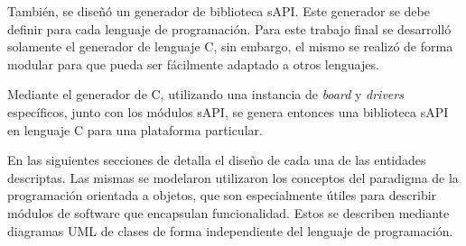 También, se diseñó un generador de biblioteca sAPI. Este generador se debe definir para cada lenguaje de programación. Para este trabajo final se desarrolló solamente el generador de lenguaje C, sin embargo, el mismo se realizó de forma modular para que pueda ser fácilmente adaptado a otros lenguajes. 

Mediante el generador de C, utilizando una instancia de \emph{board} y \emph{drivers} específicos, junto con los módulos sAPI, se genera entonces una biblioteca sAPI en lenguaje C para una plataforma particular.

En las siguientes secciones de detalla el diseño de cada una de las entidades descriptas. Las mismas se modelaron utilizaron los conceptos del paradigma de la programación orientada a objetos, que son especialmente útiles para describir módulos de software que encapsulan funcionalidad. Estos se describen mediante diagramas UML de clases de forma independiente del lenguaje de programación.
